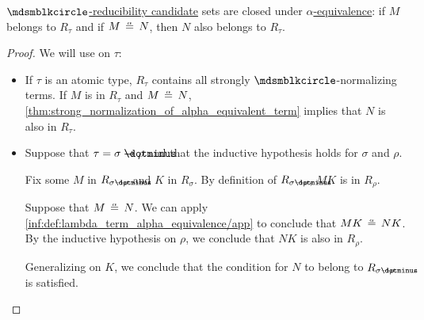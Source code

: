 \begin{lemma}\label{thm:alpha_equivalent_reducibility_candidates}
  \hyperref[def:strong_normalization_reducibility_candidate]{\( \Anon \)-reducibility candidate} sets are closed under \hyperref[def:lambda_term_alpha_equivalence]{\( \alpha \)-equivalence}: if \( M \) belongs to \( R_\tau \) and if \( M \aequiv N \), then \( N \) also belongs to \( R_\tau \).
\end{lemma}
\begin{proof}
  We will use  on \( \tau \):
  \begin{itemize}
    \item If \( \tau \) is an atomic type, \( R_\tau \) contains all strongly \( \Anon \)-normalizing terms. If \( M \) is in \( R_\tau \) and \( M \aequiv N \), \cref{thm:strong_normalization_of_alpha_equivalent_term} implies that \( N \) is also in \( R_\tau \).

    \item Suppose that \( \tau = \sigma \synimplies \rho \) and that the inductive hypothesis holds for \( \sigma \) and \( \rho \).

    Fix some \( M \) in \( R_{\sigma \synimplies \rho} \) and \( K \) in \( R_\sigma \). By definition of \( R_{\sigma \synimplies \rho} \), \( MK \) is in \( R_\rho \).

    Suppose that \( M \aequiv N \). We can apply \ref{inf:def:lambda_term_alpha_equivalence/app} to conclude that \( MK \aequiv NK \). By the inductive hypothesis on \( \rho \), we conclude that \( NK \) is also in \( R_\rho \).

    Generalizing on \( K \), we conclude that the condition for \( N \) to belong to \( R_{\sigma \synimplies \rho} \) is satisfied.
  \end{itemize}
\end{proof}

